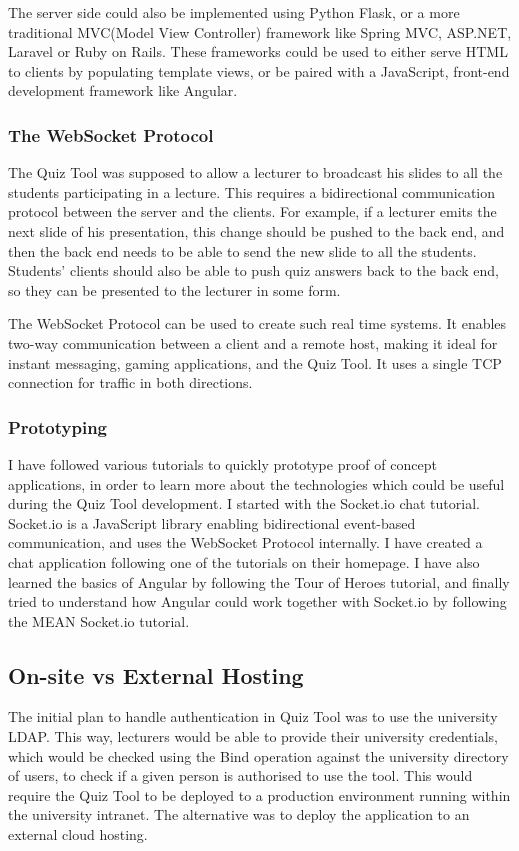 The server side could also be implemented using Python Flask\cite{flask}, or a more
traditional MVC(Model View Controller)\cite{mvc} framework like Spring MVC\cite{spring},
ASP.NET\cite{asp}, Laravel\cite{laravel} or Ruby on Rails\cite{ror}. These frameworks could be used
to either serve HTML to clients by populating template views, or be paired
with a JavaScript, front-end development framework like Angular.

\subsubsection{The WebSocket Protocol}
The Quiz Tool was supposed to allow a lecturer to broadcast his slides to all the students
participating in a lecture. This requires a bidirectional communication protocol between the
server and the clients. For example, if a lecturer emits the next slide of his presentation,
this change should be pushed to the back end, and then the back end needs to be able to
send the new slide to all the students. Students' clients should also be able to push quiz
answers back to the back end, so they can be presented to the lecturer in some form.

The WebSocket Protocol can be used to create such real time systems. It enables two-way
communication between a client and a remote host, making it ideal for instant messaging,
gaming applications, and the Quiz Tool. It uses a single TCP connection for traffic
in both directions\cite{11}.

\subsubsection{Prototyping}
I have followed various tutorials to quickly prototype proof of concept applications,
in order to learn more about the technologies which could be useful during the Quiz Tool
development. I started with the Socket.io chat tutorial. Socket.io is
a JavaScript library enabling bidirectional event-based communication, and uses
the WebSocket Protocol internally\cite{12}. I have created a chat application following one
of the tutorials on their homepage\cite{13}. I have also learned the basics of
Angular by following the Tour of Heroes tutorial\cite{14}, and finally tried to
understand how Angular could work together with Socket.io by following the MEAN
Socket.io tutorial\cite{15}.

\subsection{On-site vs External Hosting}
The initial plan to handle authentication in Quiz Tool was to use the university
LDAP\cite{16}. This way, lecturers would be able to provide their university credentials,
which would be checked using the Bind operation against the university directory of users,
to check if a given person is authorised to use the tool. This would require the Quiz Tool
to be deployed to a production environment running within the university intranet. The
alternative was to deploy the application to an external cloud hosting.


